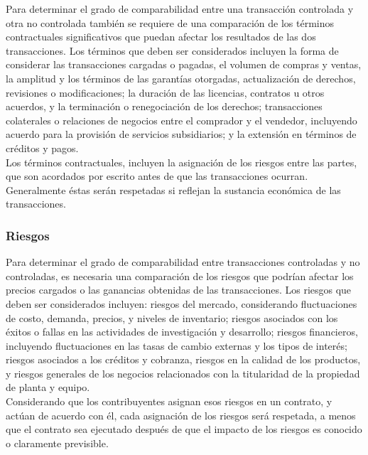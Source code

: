 \begin{enumerate}[1.]
Para determinar el grado de comparabilidad entre una transacción controlada y otra no controlada también se requiere de una comparación de los términos contractuales significativos que puedan afectar los resultados de las dos transacciones. Los términos que deben ser considerados incluyen la forma de considerar las transacciones cargadas o pagadas, el volumen de compras y ventas, la amplitud y los términos de las garantías otorgadas, actualización de derechos, revisiones o modificaciones; la duración de las licencias, contratos u otros acuerdos, y la terminación o renegociación de los derechos; transacciones colaterales o relaciones de negocios entre el comprador y el vendedor, incluyendo acuerdo para la provisión de servicios subsidiarios; y la extensión en términos de créditos y pagos. \\

Los términos contractuales, incluyen la asignación de los riesgos entre las partes, que son acordados por escrito antes de que las transacciones ocurran. Generalmente éstas serán respetadas si reflejan la sustancia económica de las transacciones.\\

\subsubsection*{Riesgos}

Para determinar el grado de comparabilidad entre transacciones controladas y no controladas, es necesaria una comparación de los riesgos que podrían afectar los precios cargados o las ganancias obtenidas de las transacciones. Los riesgos que deben ser considerados incluyen: riesgos del mercado, considerando fluctuaciones de costo, demanda, precios, y niveles de inventario; riesgos asociados con los éxitos o fallas en las actividades de investigación y desarrollo; riesgos financieros, incluyendo fluctuaciones en las tasas de cambio externas y los tipos de interés; riesgos asociados a los créditos y cobranza, riesgos en la calidad de los productos, y riesgos generales de los negocios relacionados con la titularidad de la propiedad de planta y equipo. \\

Considerando que los contribuyentes asignan esos riesgos en un contrato, y actúan de acuerdo con él, cada asignación de los riesgos será respetada, a menos que el contrato sea ejecutado después de que el impacto de los riesgos es conocido o claramente previsible. \\


\end{enumerate}

